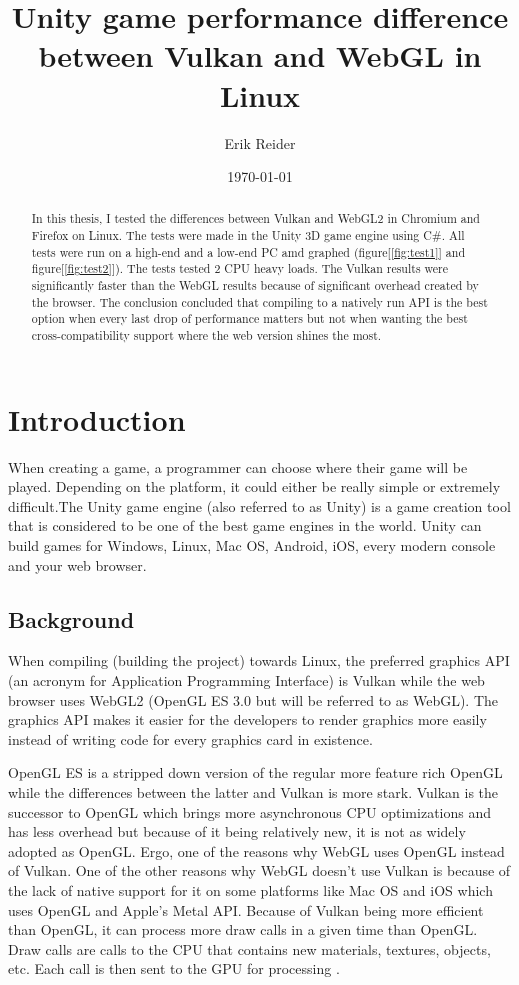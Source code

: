 \documentclass{article}
\title{Unity game performance difference between Vulkan and WebGL in Linux}
\author{Erik Reider}
\date{\today}
\begin{document}
\maketitle
\newpage

\begin{abstract}
    In this thesis, I tested the differences between Vulkan and WebGL2 in Chromium and Firefox on Linux. The tests were made in the Unity 3D game engine using C\#. All tests were run on a high-end and a low-end PC amd graphed (figure[\ref{fig:test1}] and figure[\ref{fig:test2}]). The tests tested 2 CPU heavy loads. The Vulkan results were significantly faster than the WebGL results because of significant overhead created by the browser. The conclusion concluded that compiling to a natively run API is the best option when every last drop of performance matters but not when wanting the best cross-compatibility support where the web version shines the most. 
\end{abstract}

\newpage


\tableofcontents
\newpage


\section {Introduction}
When creating a game, a programmer can choose where their game will be played. Depending on the platform, it could either be really simple or extremely difficult.The Unity game engine (also referred to as Unity) is a game creation tool that is considered to be one of the best game engines in the world. Unity can build games for Windows, Linux, Mac OS, Android, iOS, every modern console and your web browser.

\subsection {Background}

When compiling (building the project) towards Linux, the preferred graphics API (an acronym for Application Programming Interface) is Vulkan while the web browser uses WebGL2 (OpenGL ES 3.0 but will be referred to as WebGL). The graphics API makes it easier for the developers to render graphics more easily instead of writing code for every graphics card in existence\cite{APIWiki}.

OpenGL ES is a stripped down version of the regular more feature rich OpenGL while the differences between the latter and Vulkan is more stark. Vulkan is the successor to OpenGL which brings more asynchronous CPU optimizations and has less overhead but because of it being relatively new, it is not as widely adopted as OpenGL. Ergo, one of the reasons why WebGL uses OpenGL instead of Vulkan. One of the other reasons why WebGL doesn’t use Vulkan is because of the lack of native support for it on some platforms like Mac OS and iOS which uses OpenGL and Apple’s Metal API. Because of Vulkan being more efficient than OpenGL, it can process more draw calls in a given time than OpenGL. Draw calls are calls to the CPU that contains new materials, textures, objects, etc. Each call is then sent to the GPU for processing \cite{DrawCalls}.
\end{document}
